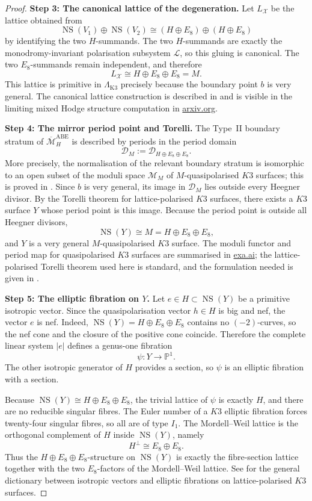 \documentclass[11pt]{amsart}
\theoremstyle{plain}
\theoremstyle{remark}
\newcommand{\NS}{\operatorname{NS}}
\newcommand{\Kthree}{\mathrm{K3}}
\newcommand{\cL}{\mathcal{L}}
\newcommand{\cX}{\mathcal{X}}
\newcommand{\cM}{\mathcal{M}}
\newcommand{\cD}{\mathcal{D}}
\newcommand{\bbP}{\mathbb{P}}
\newcommand{\Lk}{\Lambda_{\Kthree}}
\begin{document}
\begin{proof}
\medskip
\noindent
\textbf{Step 3: The canonical lattice of the degeneration.}
Let \(L_{\cX}\) be the lattice obtained from
\[
\NS(V_1)\oplus\NS(V_2)\cong (H\oplus E_8)\oplus(H\oplus E_8)
\]
by identifying the two \(H\)-summands. The two \(H\)-summands are exactly the
monodromy-invariant polarisation subsystem \(\cL\), so this gluing is canonical.
The two \(E_8\)-summands remain independent, and therefore
\[
L_{\cX}\cong H\oplus E_8\oplus E_8=M.
\]
This lattice is primitive in \(\Lk\) precisely because the boundary point \(b\)
is very general. The canonical lattice construction is described in
\cite[Section~5]{dfk3slpms} and is visible in the limiting mixed Hodge structure
computation in
\href{https://arxiv.org/html/2405.12009}{arxiv.org}.

\medskip
\noindent
\textbf{Step 4: The mirror period point and Torelli.}
The Type~II boundary stratum of \(\overline{\cM}_H^{\mathrm{ABE}}\) is described
by periods in the period domain
\[
\cD_M:=\cD_{H\oplus E_8\oplus E_8}.
\]
More precisely, the normalisation of the relevant boundary stratum is isomorphic
to an open subset of the moduli space \(\cM_M\) of \(M\)-quasipolarised \(K3\)
surfaces; this is proved in \cite[Section~5]{dfk3slpms}. Since \(b\) is very
general, its image in \(\cD_M\) lies outside every Heegner divisor. By the
Torelli theorem for lattice-polarised \(K3\) surfaces, there exists a \(K3\)
surface \(Y\) whose period point is this image. Because the period point is
outside all Heegner divisors,
\[
\NS(Y)\cong M=H\oplus E_8\oplus E_8,
\]
and \(Y\) is a very general \(M\)-quasipolarised \(K3\) surface. The moduli
functor and period map for quasipolarised \(K3\) surfaces are summarised in
\href{https://exa.ai/library/publication/xr8dkyl88dy}{exa.ai}; the
lattice-polarised Torelli theorem used here is standard, and the formulation
needed is given in \cite[Section~2]{dfk3slpms}.

\medskip
\noindent
\textbf{Step 5: The elliptic fibration on \(Y\).}
Let \(e\in H\subset \NS(Y)\) be a primitive isotropic vector. Since the
quasipolarisation vector \(h\in H\) is big and nef, the vector \(e\) is nef.
Indeed, \(\NS(Y)=H\oplus E_8\oplus E_8\) contains no \((-2)\)-curves, so the
nef cone and the closure of the positive cone coincide. Therefore the complete
linear system \(|e|\) defines a genus-one fibration
\[
\psi\colon Y\longrightarrow \bbP^1.
\]
The other isotropic generator of \(H\) provides a section, so \(\psi\) is an
elliptic fibration with a section.

Because \(\NS(Y)\cong H\oplus E_8\oplus E_8\), the trivial lattice of \(\psi\)
is exactly \(H\), and there are no reducible singular fibres. The Euler number of
a \(K3\) elliptic fibration forces twenty-four singular fibres, so all are of
type \(I_1\). The Mordell--Weil lattice is the orthogonal complement of \(H\)
inside \(\NS(Y)\), namely
\[
H^\perp\cong E_8\oplus E_8.
\]
Thus the \(H\oplus E_8\oplus E_8\)-structure on \(\NS(Y)\) is exactly the
fibre-section lattice together with the two \(E_8\)-factors of the
Mordell--Weil lattice. See \cite[Section~4]{dfk3slpms} for the general
dictionary between isotropic vectors and elliptic fibrations on lattice-polarised
\(K3\) surfaces.


\end{proof}
\end{document}
